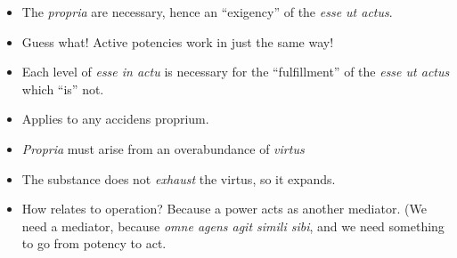 \begin{DONE}

\begin{itemize}
\item The \emph{propria} are necessary, hence an “exigency” of the \emph{esse ut actus}.

\item Guess what! Active potencies work in just the same way!

\item Each level of \emph{esse in actu} is necessary for the “fulfillment” of the \emph{esse ut actus} which “is” not.

  \item Applies to any accidens proprium.
  \item \emph{Propria} must arise from an overabundance of \emph{virtus}
  \item  The substance does not \emph{exhaust} the virtus, so it expands.
  \item How relates to operation? Because a power acts as another mediator. (We need a mediator, because \emph{omne agens agit simili sibi}, and we need something to go from potency to act.

\end{itemize}

\end{DONE}

